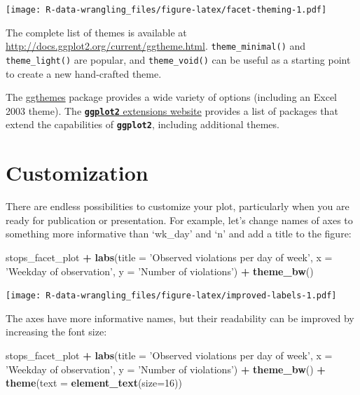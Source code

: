 \documentclass[]{book}
\newenvironment{Shaded}{\begin{snugshade}}{\end{snugshade}}
\newcommand{\DataTypeTok}[1]{\textcolor[rgb]{0.13,0.29,0.53}{#1}}
\newcommand{\DecValTok}[1]{\textcolor[rgb]{0.00,0.00,0.81}{#1}}
\newcommand{\KeywordTok}[1]{\textcolor[rgb]{0.13,0.29,0.53}{\textbf{#1}}}
\newcommand{\NormalTok}[1]{#1}
\newcommand{\OperatorTok}[1]{\textcolor[rgb]{0.81,0.36,0.00}{\textbf{#1}}}
\newcommand{\StringTok}[1]{\textcolor[rgb]{0.31,0.60,0.02}{#1}}
\begin{document}
\texttt{[image: R-data-wrangling\_files/figure-latex/facet-theming-1.pdf]}

The complete list of themes is available
at \url{http://docs.ggplot2.org/current/ggtheme.html}. \texttt{theme\_minimal()} and \texttt{theme\_light()} are popular, and \texttt{theme\_void()} can be useful as a starting point to create a new hand-crafted theme.

The \href{https://cran.r-project.org/web/packages/ggthemes/vignettes/ggthemes.html}{ggthemes} package
provides a wide variety of options (including an Excel 2003 theme).
The \href{https://www.ggplot2-exts.org}{\textbf{\texttt{ggplot2}} extensions website} provides a list
of packages that extend the capabilities of \textbf{\texttt{ggplot2}}, including additional themes.

\hypertarget{customization}{%
\section{Customization}\label{customization}}

There are endless possibilities to customize your plot, particularly when you are ready for publication or presentation. For example, let's change names of axes to something more informative than `wk\_day' and `n' and add a title to the figure:

\begin{Shaded}
\begin{Highlighting}[]
\NormalTok{stops_facet_plot }\OperatorTok{+}
\StringTok{  }\KeywordTok{labs}\NormalTok{(}\DataTypeTok{title =} \StringTok{'Observed violations per day of week'}\NormalTok{,}
         \DataTypeTok{x =} \StringTok{'Weekday of observation'}\NormalTok{,}
         \DataTypeTok{y =} \StringTok{'Number of violations'}\NormalTok{) }\OperatorTok{+}
\StringTok{  }\KeywordTok{theme_bw}\NormalTok{()}
\end{Highlighting}
\end{Shaded}

\texttt{[image: R-data-wrangling\_files/figure-latex/improved-labels-1.pdf]}

The axes have more informative names, but their readability can be improved by
increasing the font size:

\begin{Shaded}
\begin{Highlighting}[]
\NormalTok{stops_facet_plot }\OperatorTok{+}
\StringTok{  }\KeywordTok{labs}\NormalTok{(}\DataTypeTok{title =} \StringTok{'Observed violations per day of week'}\NormalTok{,}
         \DataTypeTok{x =} \StringTok{'Weekday of observation'}\NormalTok{,}
         \DataTypeTok{y =} \StringTok{'Number of violations'}\NormalTok{) }\OperatorTok{+}
\StringTok{  }\KeywordTok{theme_bw}\NormalTok{() }\OperatorTok{+}\StringTok{ }
\StringTok{  }\KeywordTok{theme}\NormalTok{(}\DataTypeTok{text =} \KeywordTok{element_text}\NormalTok{(}\DataTypeTok{size=}\DecValTok{16}\NormalTok{))}
\end{Highlighting}
\end{Shaded}
\end{document}
